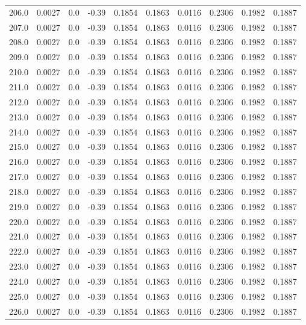 \begin{longtable}{lrrrrrrrrr}
206.0 & 0.0027 & 0.0 & -0.39 & 0.1854 & 0.1863 & 0.0116 & 0.2306 & 0.1982 & 0.1887 \\
207.0 & 0.0027 & 0.0 & -0.39 & 0.1854 & 0.1863 & 0.0116 & 0.2306 & 0.1982 & 0.1887 \\
208.0 & 0.0027 & 0.0 & -0.39 & 0.1854 & 0.1863 & 0.0116 & 0.2306 & 0.1982 & 0.1887 \\
209.0 & 0.0027 & 0.0 & -0.39 & 0.1854 & 0.1863 & 0.0116 & 0.2306 & 0.1982 & 0.1887 \\
210.0 & 0.0027 & 0.0 & -0.39 & 0.1854 & 0.1863 & 0.0116 & 0.2306 & 0.1982 & 0.1887 \\
211.0 & 0.0027 & 0.0 & -0.39 & 0.1854 & 0.1863 & 0.0116 & 0.2306 & 0.1982 & 0.1887 \\
212.0 & 0.0027 & 0.0 & -0.39 & 0.1854 & 0.1863 & 0.0116 & 0.2306 & 0.1982 & 0.1887 \\
213.0 & 0.0027 & 0.0 & -0.39 & 0.1854 & 0.1863 & 0.0116 & 0.2306 & 0.1982 & 0.1887 \\
214.0 & 0.0027 & 0.0 & -0.39 & 0.1854 & 0.1863 & 0.0116 & 0.2306 & 0.1982 & 0.1887 \\
215.0 & 0.0027 & 0.0 & -0.39 & 0.1854 & 0.1863 & 0.0116 & 0.2306 & 0.1982 & 0.1887 \\
216.0 & 0.0027 & 0.0 & -0.39 & 0.1854 & 0.1863 & 0.0116 & 0.2306 & 0.1982 & 0.1887 \\
217.0 & 0.0027 & 0.0 & -0.39 & 0.1854 & 0.1863 & 0.0116 & 0.2306 & 0.1982 & 0.1887 \\
218.0 & 0.0027 & 0.0 & -0.39 & 0.1854 & 0.1863 & 0.0116 & 0.2306 & 0.1982 & 0.1887 \\
219.0 & 0.0027 & 0.0 & -0.39 & 0.1854 & 0.1863 & 0.0116 & 0.2306 & 0.1982 & 0.1887 \\
220.0 & 0.0027 & 0.0 & -0.39 & 0.1854 & 0.1863 & 0.0116 & 0.2306 & 0.1982 & 0.1887 \\
221.0 & 0.0027 & 0.0 & -0.39 & 0.1854 & 0.1863 & 0.0116 & 0.2306 & 0.1982 & 0.1887 \\
222.0 & 0.0027 & 0.0 & -0.39 & 0.1854 & 0.1863 & 0.0116 & 0.2306 & 0.1982 & 0.1887 \\
223.0 & 0.0027 & 0.0 & -0.39 & 0.1854 & 0.1863 & 0.0116 & 0.2306 & 0.1982 & 0.1887 \\
224.0 & 0.0027 & 0.0 & -0.39 & 0.1854 & 0.1863 & 0.0116 & 0.2306 & 0.1982 & 0.1887 \\
225.0 & 0.0027 & 0.0 & -0.39 & 0.1854 & 0.1863 & 0.0116 & 0.2306 & 0.1982 & 0.1887 \\
226.0 & 0.0027 & 0.0 & -0.39 & 0.1854 & 0.1863 & 0.0116 & 0.2306 & 0.1982 & 0.1887 \\

\end{longtable}
